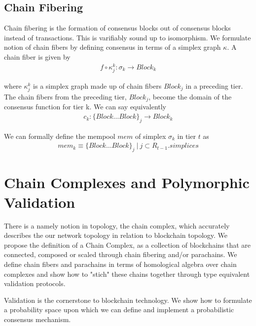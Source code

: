\documentclass{article}
\begin{document}
\subsection{Chain Fibering}
Chain fibering is the formation of consensus blocks out of consensus blocks instead of transactions. This is varifiably sound up to isomorphism. We formulate notion of chain fibers by defining consensus in terms of a simplex graph $\kappa$. A chain fiber is given by 
\begin{equation} \label{eq1}
\begin{split}
f \circ \kappa_j^{k}: \sigma_k  \rightarrow Block_k
\end{split}
\end{equation}

where $\kappa_j^{k}$ is a simplex graph made up of chain fibers $Block_j$ in a preceding tier. The chain fibers from the preceding tier, $Block_j$, become the domain of the consensus function for tier k. We can say equivalently
\begin{equation} \label{eq1}
\begin{split}
c_k: \{Block \dots Block\}_j \rightarrow Block_k
\end{split}
\end{equation}

We can formally define the mempool $mem$ of simplex $\sigma_k$ in tier $t$ as 
\begin{equation} \label{eq1}
\begin{split}
mem_k \equiv \{Block \dots Block\}_j \ | \ j \subset R_{t-1}.simplices
\end{split}
\end{equation}

\section{Chain Complexes and Polymorphic Validation}
There is a namely notion in topology, the chain complex, which accurately describes the our network topology in relation to blockchain topology. We propose the definition of a Chain Complex, as a collection of blockchains that are connected, composed or scaled through chain fibering and/or parachains. We define chain fibers and parachains in terms of homological algebra over chain complexes and show how to "stich" these chains together through type equivalent validation protocols.

Validation is the cornerstone to blockchain technology. We show how to formulate a probability space upon which we can define and implement a probabilistic consensus mechanism.
\end{document}
